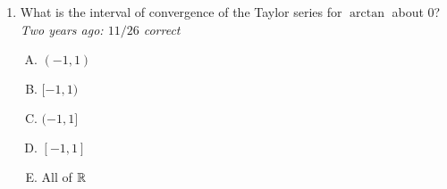 \documentclass[10pt]{amsart}
\begin{document}
\begin{enumerate}
  \begin{enumerate}[(A)]
  \item It is the minimum of the distances from $c$ to the $\alpha_i$s.
  \item It is the second smallest of the distances from $c$ to the
    $\alpha_i$s.
  \item It is the arithmetic mean of the distances from $c$ to the $\alpha_i$s.
  \item It is the second largest of the distances from $c$ to the
    $\alpha_i$s.
  \item It is the maximum of the distances from $c$ to the $\alpha_i$s.
  \end{enumerate}

  {\em Answer}: Option (A)

  {\em Explanation}: Since the Taylor series converges to the function
  on its interval of convergence, the interval of convergence must be
  contained in the domain of definition. In particular, it must
  exclude all the $\alpha_i$s. Hence, the radius of convergence cannot
  be more than the minimum of the distances from $c$ to the
  $\alpha_i$s.

  That it is exactly equal to the minimum can be shown by using the
  fact that we get a product of geometric series.

  {\em Performance review}: $21$ out of $24$ got this. $2$ chose (E),
  $1$ chose (C).

  {\em Historical note (Math 153)}: $34$ out of $42$ got this. $6$ chose (C),
  $2$ chose (D).

  {\em Historical note (last year)}: $3$ out of $11$ got this correct. $4$
  chose (E), $2$ chose (C), $1$ chose (B).

  {\em Historical note (two years ago)}: $10$ out of $26$ people got this
  correct. $6$ people chose (C), $5$ chose (E), $2$ each chose (B) and
  (D), $1$ left the question blank.

\item What is the interval of convergence of the Taylor series for
  $\arctan$ about $0$? {\em Two years ago: $11/26$ correct}
  
  \begin{enumerate}[(A)]
  \item $(-1,1)$
  \item $[-1,1)$
  \item $(-1,1]$
  \item $[-1,1]$
  \item All of $\mathbb{R}$
  \end{enumerate}


\end{enumerate}
\end{document}
